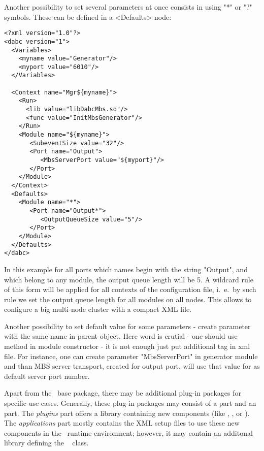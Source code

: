 Another possibility to set several parameters at once 
consists in  using "*" or "?" symbols.
These can be defined in a  <Defaults> node: 

\begin{small}
\begin{verbatim}
<?xml version="1.0"?>
<dabc version="1">
  <Variables>
    <myname value="Generator"/> 
    <myport value="6010"/> 
  </Variables>

  <Context name="Mgr${myname}">
    <Run>
      <lib value="libDabcMbs.so"/>
      <func value="InitMbsGenerator"/>
    </Run>
    <Module name="${myname}">
       <SubeventSize value="32"/>
       <Port name="Output">
          <MbsServerPort value="${myport}"/>
       </Port>
    </Module>
  </Context>
  <Defaults>
    <Module name="*">
       <Port name="Output*">
          <OutputQueueSize value="5"/>
       </Port>
    </Module>
  </Defaults>
</dabc>
\end{verbatim}
\end{small}

In this example for all ports which names begin with the string "Output", 
and which belong to any module, the output queue length will be 5. 
A wildcard rule of this form will be applied for 
all contexts of the configuration file, 
i.~e.\ by such rule we set the output queue length for all modules on all nodes. 
This allows to configure a big multi-node cluster with
a compact XML file.

Another possibility to set default value for some parameters - create
parameter with the same name in parent object. Here word  
is crutial - one should use  method in module constructor - 
it is not enough just put additional tag in xml file. For instance, one can
create parameter "MbsServerPort" in generator module and than 
MBS server transport, created for output port, will use that value for 
as default server port number.  



Apart from the \dabc\ base package, there may be additional plug-in packages for
specific use cases. Generally, these plug-in packages may consist of a
 part and an  part.
The {\em plugins} part offers a library
containing new components (like , 
, or ). The {\em applications} part
mostly contains the XML setup files to use these new components in the
\dabc\ runtime environment; however, it 
may contain an additonal library defining the \dabc\ 
class.

